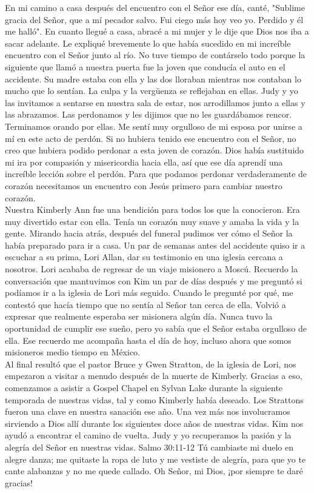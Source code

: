 \documentclass[twoside, 12pt]{book}
\begin{document}
En mi camino a casa después del encuentro con el Señor ese día, canté, "Sublime gracia del Señor, que a mí pecador salvo. Fui ciego más hoy veo yo. Perdido y él me halló". En cuanto llegué a casa, abracé a mi mujer y le dije que Dios nos iba a sacar adelante. Le expliqué brevemente lo que había sucedido en mi increíble encuentro con el Señor junto al río. No tuve tiempo de contárselo todo porque la siguiente que llamó a nuestra puerta fue la joven que conducía el auto en el accidente. Su madre estaba con ella y las dos lloraban mientras nos contaban lo mucho que lo sentían. La culpa y la vergüenza se reflejaban en ellas. Judy y yo las invitamos a sentarse en nuestra sala de estar, nos arrodillamos junto a ellas y las abrazamos. Las perdonamos y les dijimos que no les guardábamos rencor. Terminamos orando por ellas. Me sentí muy orgulloso de mi esposa por unirse a mí en este acto de perdón. Si no hubiera tenido ese encuentro con el Señor, no creo que hubiera podido perdonar a esta joven de corazón. Dios había sustituido mi ira por compasión y misericordia hacia ella, así que ese día aprendí una increíble lección sobre el perdón. Para que podamos perdonar verdaderamente de corazón necesitamos un encuentro con Jesús primero para cambiar nuestro corazón.\\

Nuestra Kimberly Ann fue una bendición para todos los que la conocieron. Era muy divertido estar con ella. Tenía un corazón muy suave y amaba la vida y la gente. Mirando hacia atrás, después del funeral pudimos ver cómo el Señor la había preparado para ir a casa. Un par de semanas antes del accidente quiso ir a escuchar a su prima, Lori Allan, dar su testimonio en una iglesia cercana a nosotros. Lori acababa de regresar de un viaje misionero a Moscú. Recuerdo la conversación que mantuvimos con Kim un par de días después y me preguntó si podíamos ir a la iglesia de Lori más seguido. Cuando le pregunté por qué, me contestó que hacía tiempo que no sentía al Señor tan cerca de ella. Volvió a expresar que realmente esperaba ser misionera algún día. Nunca tuvo la oportunidad de cumplir ese sueño, pero yo sabía que el Señor estaba orgulloso de ella. Ese recuerdo me acompaña hasta el día de hoy, incluso ahora que somos misioneros medio tiempo en México.\\

Al final resultó que el pastor Bruce y Gwen Stratton, de la iglesia de Lori, nos empezaron a visitar a menudo después de la muerte de Kimberly. Gracias a eso, comenzamos a asistir a Gospel Chapel en Sylvan Lake durante la siguiente temporada de nuestras vidas, tal y como Kimberly había deseado. Los Strattons fueron una clave en nuestra sanación ese año. Una vez más nos involucramos sirviendo a Dios allí durante los siguientes doce años de nuestras vidas. Kim nos ayudó a encontrar el camino de vuelta. Judy y yo recuperamos la pasión y la alegría del Señor en nuestras vidas. Salmo 30:11-12 Tú cambiaste mi duelo en alegre danza; me quitaste la ropa de luto y me vestiste de alegría, para que yo te cante alabanzas y no me quede callado. Oh Señor, mi Dios, ¡por siempre te daré gracias!\\
\end{document}
